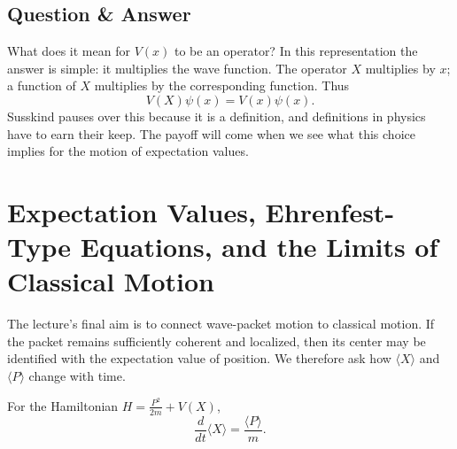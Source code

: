 \subsection{Question \& Answer}

What does it mean for \(V(x)\) to be an operator? In this representation the answer is simple: it multiplies the wave function. The operator \(X\) multiplies by \(x\); a function of \(X\) multiplies by the corresponding function. Thus
\begin{equation}
V(X)\psi(x)=V(x)\psi(x).
\end{equation}
Susskind pauses over this because it is a definition, and definitions in physics have to earn their keep. The payoff will come when we see what this choice implies for the motion of expectation values.

\section{Expectation Values, Ehrenfest-Type Equations, and the Limits of Classical Motion}

The lecture's final aim is to connect wave-packet motion to classical motion. If the packet remains sufficiently coherent and localized, then its center may be identified with the expectation value of position. We therefore ask how \(\langle X\rangle\) and \(\langle P\rangle\) change with time.

\begin{proposition}
For the Hamiltonian \(H=\frac{P^2}{2m}+V(X)\),
\begin{equation}
\frac{d}{dt}\langle X\rangle=\frac{\langle P\rangle}{m}.
\end{equation}
\end{proposition}

